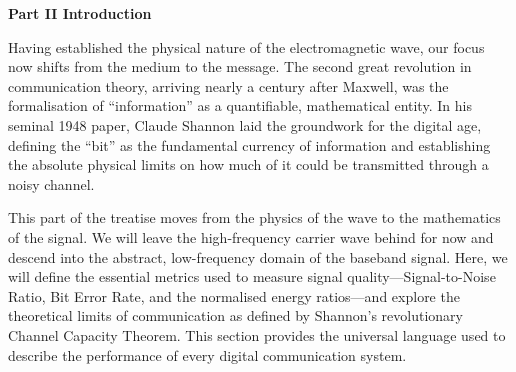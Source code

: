 \newpage
\thispagestyle{empty}

\vspace*{3cm}

\begin{center}
{\Large\lorettadisplay\bfseries Part II Introduction}
\end{center}

\vspace{2cm}

Having established the physical nature of the electromagnetic wave, our focus now shifts from the medium to the message. The second great revolution in communication theory, arriving nearly a century after Maxwell, was the formalisation of ``information'' as a quantifiable, mathematical entity. In his seminal 1948 paper, Claude Shannon laid the groundwork for the digital age, defining the ``bit'' as the fundamental currency of information and establishing the absolute physical limits on how much of it could be transmitted through a noisy channel.

\vspace{1em}

This part of the treatise moves from the physics of the wave to the mathematics of the signal. We will leave the high-frequency carrier wave behind for now and descend into the abstract, low-frequency domain of the baseband signal. Here, we will define the essential metrics used to measure signal quality---Signal-to-Noise Ratio, Bit Error Rate, and the normalised energy ratios---and explore the theoretical limits of communication as defined by Shannon's revolutionary Channel Capacity Theorem. This section provides the universal language used to describe the performance of every digital communication system.

\vspace*{\fill}
\newpage
